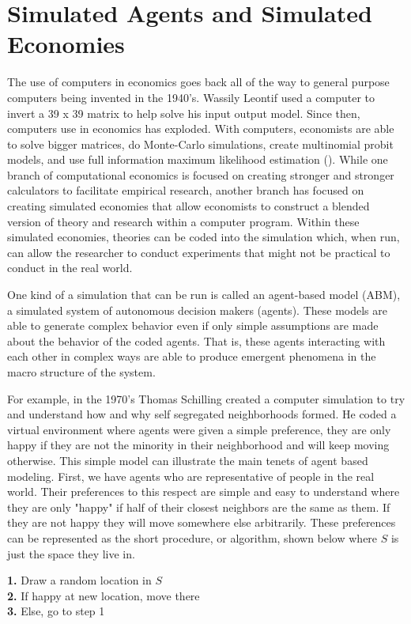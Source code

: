 \documentclass[12pt,twoside]{reedthesis}
\begin{document}
	
\section{Simulated Agents and Simulated Economies}
The use of computers in economics goes back all of the way to general purpose computers being invented in the 1940's. Wassily Leontif used a computer to invert a 39 x 39 matrix to help solve his input output model. Since then, computers use in economics has exploded. With computers, economists are able to solve bigger matrices, do Monte-Carlo simulations, create multinomial probit models, and use full information maximum likelihood estimation (\cite{Backhouse2016}). While one branch of computational economics is focused on creating stronger and stronger calculators to facilitate empirical research, another branch has focused on creating simulated economies that allow economists to construct a blended version of theory and research within a computer program. Within these simulated economies, theories can be coded into the simulation which, when run, can allow the researcher to conduct experiments that might not be practical to conduct in the real world. 

One kind of a simulation that can be run is called an agent-based model (ABM), a simulated system of autonomous decision makers (agents). These models are able to generate complex behavior even if only simple assumptions are made about the behavior of the coded agents. That is, these agents interacting with each other in complex ways are able to produce emergent phenomena in the macro structure of the system.

For example, in the 1970's Thomas Schilling created a computer simulation to try and understand how and why self segregated neighborhoods formed. He coded a virtual environment where agents were given a simple preference, they are only happy if they are not the minority in their neighborhood and will keep moving otherwise. This simple model can illustrate the main tenets of agent based modeling. First, we have agents who are representative of people in the real world. Their preferences to this respect are simple and easy to understand where they are only "happy" if half of their closest neighbors are the same as them. If they are not happy they will move somewhere else arbitrarily. These preferences can be represented as the short procedure, or algorithm, shown below where $S$ is just the space they live in.

\begin{adjustwidth}{1cm}{}
	\textbf{1.} Draw a random location in $S$ \\
	\textbf{2.} If happy at new location, move there\\
	\textbf{3.} Else, go to step 1
\end{adjustwidth}
\end{document}
